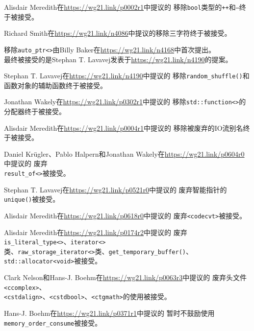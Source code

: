 Alisdair Meredith在\url{https://wg21.link/p0002r1}中提议的
移除\texttt{bool}类型的\texttt{++}和\texttt{--}终于被接受。

Richard Smith在\url{https://wg21.link/n4086}中提议的移除三字符终于被接受。

移除\texttt{auto\_ptr<>}由Billy Baker在\url{https://wg21.link/n4168}中首次提出。\\
最终被接受的是Stephan T. Lavavej发表于\url{https://wg21.link/n4190}的提案。

Stephan T. Lavavej在\url{https://wg21.link/n4190}中提议的
移除\texttt{random\_shuffle()}和函数对象的辅助函数终于被接受。

Jonathan Wakely在\url{https://wg21.link/p0302r1}中提议的
移除\texttt{std::function<>}的分配器终于被接受。

Alisdair Meredith在\url{https://wg21.link/p0004r1}中提议的
移除被废弃的IO流别名终于被接受。

Daniel Krügler、Pablo Halpern和Jonathan Wakely在\url{https://wg21.link/p0604r0}中提议的
废弃\\
\texttt{result\_of<>}被接受。

Stephan T. Lavavej在\url{https://wg21.link/p0521r0}中提议的
废弃智能指针的\texttt{unique()}被接受。

Alisdair Meredith在\url{https://wg21.link/p0618r0}中提议的
废弃\texttt{<codecvt>}被接受。

Alisdair Meredith在\url{https://wg21.link/p0174r2}中提议的
废弃\texttt{is\_literal\_type<>}、\texttt{iterator<>}\\
类、\texttt{raw\_storage\_iterator<>}类、\texttt{get\_temporary\_buffer()}、
\texttt{std::allocator<void>}被接受。

Clark Nelson和Hans-J. Boehm在\url{https://wg21.link/p0063r3}中提议的
废弃头文件\texttt{<ccomplex>}、\\
\texttt{<cstdalign>}、\texttt{<cstdbool>}、\texttt{<ctgmath>}的使用被接受。

Hans-J. Boehm在\url{https://wg21.link/p0371r1}中提议的
暂时不鼓励使用\texttt{memory\_order\_consume}被接受。